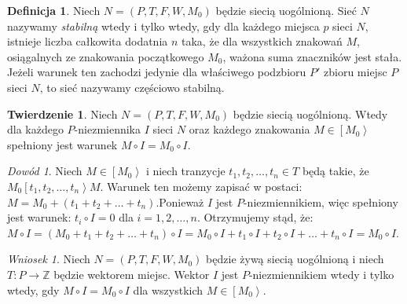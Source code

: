 \documentclass[a4paper,12pt]{book}
\theoremstyle{definition}
\newtheorem{twr}{Twierdzenie}
\newtheorem{df}{Definicja}
\theoremstyle{remark}
\newtheorem*{pr}{Dowód}
\newtheorem{concl}{Wniosek}
\begin{document}
     
\begin{df}
Niech $N=(P,T,F,W,M_0)$ będzie siecią uogólnioną. Sieć $N$ nazywamy \textit{stabilną} wtedy i tylko wtedy, gdy dla każdego miejsca $p$ sieci $N$, istnieje liczba całkowita dodatnia $n$ taka, że dla wszystkich znakowań $M$, osiągalnych ze znakowania początkowego $M_0$, ważona suma znaczników jest stała. Jeżeli warunek ten zachodzi jedynie dla właściwego podzbioru $P'$ zbioru miejsc $P$ sieci $N$, to sieć nazywamy częściowo stabilną.\end{df}
\begin{twr}
Niech $N=(P,T,F,W,M_0)$ będzie siecią uogólnioną. Wtedy dla każdego $P$-niezmiennika $I$ sieci $N$ oraz każdego znakowania $M \in \left[M_0\right>$ spełniony jest warunek $M \circ I = M_0 \circ I$.  
\end{twr}
\setcounter{concl}{1}
\begin{pr}
Niech $M \in \left[M_0\right>$ i niech tranzycje $t_1,t_2,\dots,t_n \in T$ będą takie, że $M_0 \left[t_1,t_2,\dots,t_n\right> M$. Warunek ten możemy zapisać w postaci: $M = M_0 + (t_1+t_2+\dots+t_n)$.Ponieważ $I$ jest $P$-niezmiennikiem, więc spełniony jest warunek: $t_i \circ I = 0$ dla $i = 1,2,\dots,n$. Otrzymujemy stąd, że: $M \circ I = (M_0 + t_1+t_2+\dots+t_n) \circ I = M_0 \circ I + t_1 \circ I + t_2 \circ I + \dots + t_n \circ I = M_0 \circ I$.
\end{pr}
\begin{concl}
Niech $N=(P,T,F,W,M_0)$ będzie żywą siecią uogólnioną i niech $T \colon P \to \mathbb{Z}$ będzie wektorem miejsc. Wektor $I$ jest $P$-niezmiennikiem wtedy i tylko wtedy, gdy $M \circ I = M_0 \circ I$ dla wszystkich $M \in \left[M_0\right>$.
\end{concl}
\end{document}
